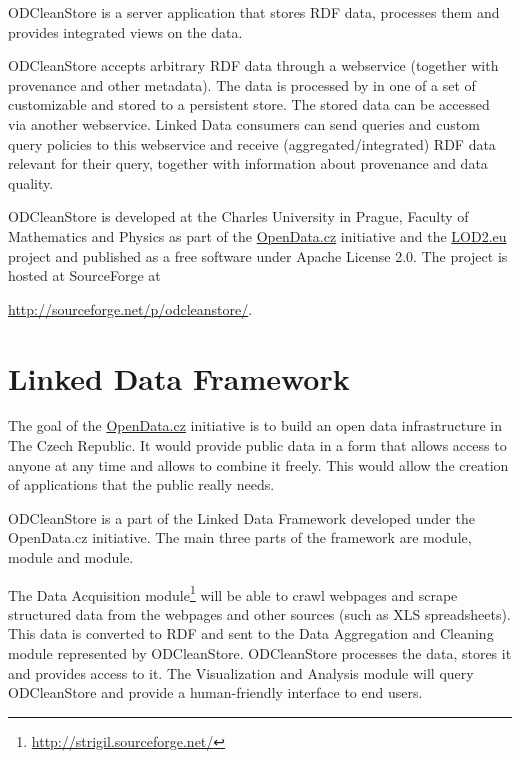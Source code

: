 ODCleanStore is a server application that stores RDF data, processes them and provides integrated views on the data.

ODCleanStore accepts arbitrary RDF data through a webservice (together with provenance and other metadata). The data is processed by  in one of a set of customizable  and stored to a persistent store. The stored data can be accessed via another webservice. Linked Data consumers can send queries and custom query policies to this webservice and receive (aggregated/integrated) RDF data relevant for their query, together with information about provenance and data quality.

ODCleanStore is developed at the Charles University in Prague, Faculty of Mathematics and Physics as part of the \href{http://opendata.cz}{OpenData.cz} initiative and the \href{http://lod2.eu}{LOD2.eu} project and published as a free software under Apache License 2.0. The project is hosted at SourceForge at
\begin{center}
  \url{http://sourceforge.net/p/odcleanstore/}.
\end{center}



\section{Linked Data Framework}

The goal of the \href{http://opendata.cz}{OpenData.cz} initiative is to build an open data infrastructure in The Czech Republic. It would provide public data in a form that allows access to anyone at any time and allows to combine it freely. This would allow the creation of applications that the public really needs.

ODCleanStore is a part of the Linked Data Framework developed under the OpenData.cz initiative. The main three parts of the framework are  module,  module and  module.


The Data Acquisition module\footnote{\url{http://strigil.sourceforge.net/}} will be able to crawl webpages and scrape structured data from the webpages and other sources (such as XLS spreadsheets). This data is converted to RDF and sent to the Data Aggregation and Cleaning module represented by ODCleanStore. ODCleanStore processes the data, stores it and provides access to it. The Visualization and Analysis module will query ODCleanStore and provide a human-friendly interface to end users.


